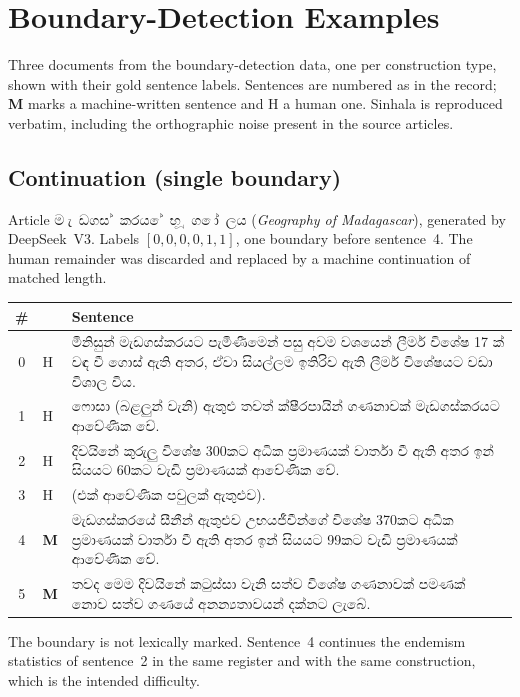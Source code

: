 \section{Boundary-Detection Examples}
\label{app:boundary-examples}

Three documents from the boundary-detection data, one per construction type,
shown with their gold sentence labels. Sentences are numbered as in the record;
\textbf{M} marks a machine-written sentence and H a human one. Sinhala is
reproduced verbatim, including the orthographic noise present in the source
articles.

\subsection{Continuation (single boundary)}

Article \si{මැඩගස්කරයේ භූගෝලය} (\emph{Geography of Madagascar}), generated by
DeepSeek~V3. Labels $[0,0,0,0,1,1]$, one boundary before sentence~4. The human
remainder was discarded and replaced by a machine continuation of matched
length.

\begin{table}[h]
\centering
\small
\begin{tabular}{@{}cl p{}@{}}
\toprule
\# & & Sentence \\
\midrule
0 & H & \si{මිනිසුන් මැඩගස්කරයට පැමිණීමෙන් පසු අවම වශයෙන් ලීමර් විශේෂ 17 ක් වඳ වී ගොස් ඇති අතර, ඒවා සියල්ලම ඉතිරිව ඇති ලීමර් විශේෂයට වඩා විශාල විය.} \\[2pt]
1 & H & \si{ෆොසා (බළලුන් වැනි) ඇතුළු තවත් ක්ෂීරපායින් ගණනාවක් මැඩගස්කරයට ආවේණික වේ.} \\[2pt]
2 & H & \si{දිවයිනේ කුරුලු විශේෂ 300කට අධික ප්‍රමාණයක් වාර්තා වී ඇති අතර ඉන් සියයට 60කට වැඩි ප්‍රමාණයක් ආවේණික වේ.} \\[2pt]
3 & H & \si{(එක් ආවේණික පවුලක් ඇතුළුව).} \\[2pt]
4 & \textbf{M} & \si{මැඩගස්කරයේ සීනීන් ඇතුළුව උභයජීවීන්ගේ විශේෂ 370කට අධික ප්‍රමාණයක් වාර්තා වී ඇති අතර ඉන් සියයට 99කට වැඩි ප්‍රමාණයක් ආවේණික වේ.} \\[2pt]
5 & \textbf{M} & \si{තවද මෙම දිවයිනේ කටුස්සා වැනි සත්ව විශේෂ ගණනාවක් පමණක් නොව සත්ව ගණයේ අනන්‍යතාවයන් දක්නට ලැබේ.} \\
\bottomrule
\end{tabular}
\end{table}

The boundary is not lexically marked. Sentence~4 continues the endemism
statistics of sentence~2 in the same register and with the same construction,
which is the intended difficulty.

